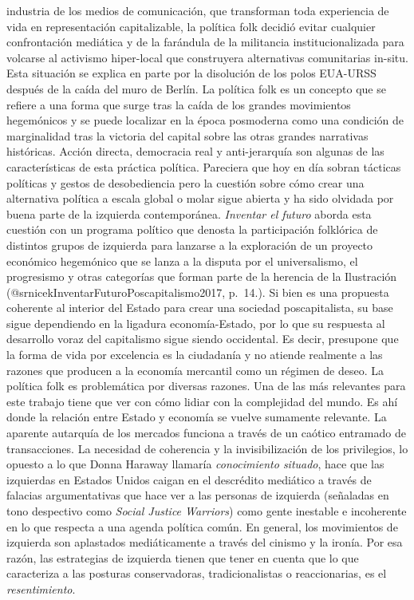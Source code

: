 \documentclass[
]{article}
\begin{document}
industria de los medios de comunicación, que transforman toda
experiencia de vida en representación capitalizable, la política folk
decidió evitar cualquier confrontación mediática y de la farándula de la
militancia institucionalizada para volcarse al activismo hiper-local que
construyera alternativas comunitarias in-situ. Esta situación se explica
en parte por la disolución de los polos EUA-URSS después de la caída del
muro de Berlín. La política folk es un concepto que se refiere a una
forma que surge tras la caída de los grandes movimientos hegemónicos y
se puede localizar en la época posmoderna como una condición de
marginalidad tras la victoria del capital sobre las otras grandes
narrativas históricas. Acción directa, democracia real y anti-jerarquía
son algunas de las características de esta práctica política. Pareciera
que hoy en día sobran tácticas políticas y gestos de desobediencia pero
la cuestión sobre cómo crear una alternativa política a escala global o
molar sigue abierta y ha sido olvidada por buena parte de la izquierda
contemporánea. \emph{Inventar el futuro} aborda esta cuestión con un
programa político que denosta la participación folklórica de distintos
grupos de izquierda para lanzarse a la exploración de un proyecto
económico hegemónico que se lanza a la disputa por el universalismo, el
progresismo y otras categorías que forman parte de la herencia de la
Ilustración (@srnicekInventarFuturoPoscapitalismo2017, p.~14.). Si bien
es una propuesta coherente al interior del Estado para crear una
sociedad poscapitalista, su base sigue dependiendo en la ligadura
economía-Estado, por lo que su respuesta al desarrollo voraz del
capitalismo sigue siendo occidental. Es decir, presupone que la forma de
vida por excelencia es la ciudadanía y no atiende realmente a las
razones que producen a la economía mercantil como un régimen de deseo.
La política folk es problemática por diversas razones. Una de las más
relevantes para este trabajo tiene que ver con cómo lidiar con la
complejidad del mundo. Es ahí donde la relación entre Estado y economía
se vuelve sumamente relevante. La aparente autarquía de los mercados
funciona a través de un caótico entramado de transacciones. La necesidad
de coherencia y la invisibilización de los privilegios, lo opuesto a lo
que Donna Haraway llamaría \emph{conocimiento situado}, hace que las
izquierdas en Estados Unidos caigan en el descrédito mediático a través
de falacias argumentativas que hace ver a las personas de izquierda
(señaladas en tono despectivo como \emph{Social Justice Warriors}) como
gente inestable e incoherente en lo que respecta a una agenda política
común. En general, los movimientos de izquierda son aplastados
mediáticamente a través del cinismo y la ironía. Por esa razón, las
estrategias de izquierda tienen que tener en cuenta que lo que
caracteriza a las posturas conservadoras, tradicionalistas o
reaccionarias, es el \emph{resentimiento}.
\end{document}

